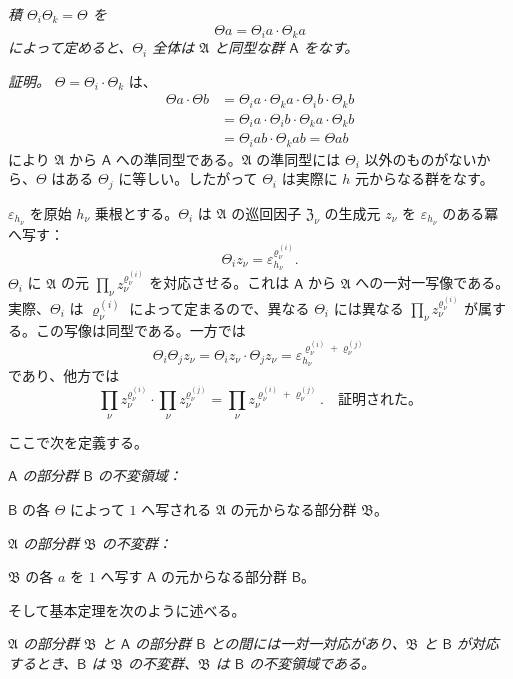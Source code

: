 \emph{積 $\Theta_i \Theta_k=\Theta$ を}
\[
\Theta a = \Theta_i a \cdot \Theta_k a
\]
\emph{によって定めると、$\Theta_i$ 全体は $\mathfrak A$ と同型な群 $\mathsf A$ をなす。}

\emph{証明。} $\Theta=\Theta_i\cdot\Theta_k$ は、
\[\begin{aligned}
\Theta a \cdot \Theta b &= \Theta_i a \cdot \Theta_k a \cdot \Theta_i b \cdot \Theta_k b \\
&= \Theta_i a \cdot \Theta_i b \cdot \Theta_k a \cdot \Theta_k b \\
&= \Theta_i a b \cdot \Theta_k a b = \Theta a b
\end{aligned}\]
により $\mathfrak A$ から $\mathsf A$ への準同型である。$\mathfrak A$ の準同型には $\Theta_i$ 以外のものがないから、$\Theta$ はある $\Theta_j$ に等しい。したがって $\Theta_i$ は実際に $h$ 元からなる群をなす。

$\varepsilon_{h_\nu}$ を原始 $h_\nu$ 乗根とする。$\Theta_i$ は $\mathfrak A$ の巡回因子 $\mathfrak Z_\nu$ の生成元 $z_\nu$ を $\varepsilon_{h_\nu}$ のある冪へ写す：
\[
\Theta_i z_\nu=\varepsilon_{h_\nu}^{\varrho_\nu^{(i)}}.
\]
$\Theta_i$ に $\mathfrak A$ の元 $\prod_\nu z_\nu^{\varrho_\nu^{(i)}}$ を対応させる。これは $\mathsf A$ から $\mathfrak A$ への一対一写像である。実際、$\Theta_i$ は $\varrho_\nu^{(i)}$ によって定まるので、異なる $\Theta_i$ には異なる $\prod_\nu z_\nu^{\varrho_\nu^{(i)}}$ が属する。この写像は同型である。一方では
\[
\Theta_i\Theta_j z_\nu=\Theta_i z_\nu\cdot \Theta_j z_\nu
=\varepsilon_{h_\nu}^{\varrho_\nu^{(i)}+\varrho_\nu^{(j)}}
\]
であり、他方では
\[
\prod_\nu z_\nu^{\varrho_\nu^{(i)}}\cdot
\prod_\nu z_\nu^{\varrho_\nu^{(j)}}=
\prod_\nu z_\nu^{\varrho_\nu^{(i)}+\varrho_\nu^{(j)}}.
\quad\text{証明された。}
\]

ここで次を定義する。

\emph{$\mathsf A$ の部分群 $\mathsf B$ の不変領域：}

$\mathsf B$ の各 $\Theta$ によって $1$ へ写される $\mathfrak A$ の元からなる部分群 $\mathfrak B$。

\emph{$\mathfrak A$ の部分群 $\mathfrak B$ の不変群：}

$\mathfrak B$ の各 $a$ を $1$ へ写す $\mathsf A$ の元からなる部分群 $\mathsf B$。

そして基本定理を次のように述べる。

\emph{$\mathfrak A$ の部分群 $\mathfrak B$ と $\mathsf A$ の部分群 $\mathsf B$ との間には一対一対応があり、$\mathfrak B$ と $\mathsf B$ が対応するとき、$\mathsf B$ は $\mathfrak B$ の不変群、$\mathfrak B$ は $\mathsf B$ の不変領域である。}

